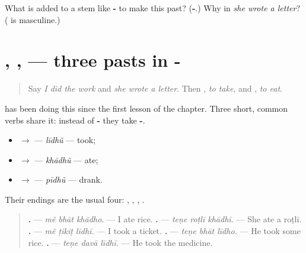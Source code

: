 \begin{tcolorbox}[breakable,colback=teal!4,colframe=teal!35!black,title={Before you move on}]
What is added to a stem like \textbf{-} to make this past? (\textbf{-}.) Why \textbf{} in \emph{she wrote a letter}? (\textbf{} is masculine.)
\end{tcolorbox}
\section[\texorpdfstring{\gu{લીધું} · \gu{ખાધું} · \gu{પીધું} (līdhũ · khādhũ · pīdhũ)}{લીધું · ખાધું · પીધું (līdhũ · khādhũ · pīdhũ)}]{, ,  — three pasts in -}

\label{lesson:GU-C148-lidhun}



\begin{quote}
Say \emph{I did the work} and \emph{she wrote a letter}. Then \textbf{}, \emph{to take}, and \textbf{}, \emph{to eat}.
\end{quote}

\begin{grammarlens}[title={Grammar Lens: -\gu{ધું}}]
\textbf{} has been doing this since the first lesson of the chapter. Three short, common verbs share it: instead of \textbf{-} they take \textbf{-}.

\begin{itemize}
\raggedright
  \item \textbf{} $\to$ \textbf{} — \emph{līdhũ} — took;
  \item \textbf{} $\to$ \textbf{} — \emph{khādhũ} — ate;
  \item \textbf{} $\to$ \textbf{} — \emph{pīdhũ} — drank.
\end{itemize}

Their endings are the usual four: \textbf{}, \textbf{}, \textbf{}, \textbf{}.

\begin{quote}
\textbf{  .} — \emph{mẽ bhāt khādho.} — I ate rice. \textbf{  .} — \emph{teṇe roṭlī khādhī.} — She ate a roṭlī. \textbf{  .} — \emph{mẽ ṭikiṭ līdhī.} — I took a ticket. \textbf{  .} — \emph{teṇe bhāt līdho.} — He took some rice. \textbf{  .} — \emph{teṇe davā līdhī.} — He took the medicine.
\end{quote}
\end{grammarlens}

